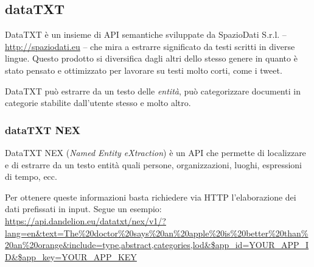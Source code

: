 \subsection{dataTXT}
	DataTXT è un insieme di API semantiche sviluppate da SpazioDati S.r.l.  -- \url{http://spaziodati.eu} -- che mira a estrarre significato da testi scritti in diverse lingue. Questo prodotto si diversifica dagli altri dello stesso genere in quanto è stato pensato e ottimizzato per lavorare su testi molto corti, come i tweet.

	DataTXT può estrarre da un testo delle \emph{entità}, può categorizzare documenti in categorie stabilite dall'utente stesso e molto altro.

%
%

	\subsubsection{dataTXT NEX}
		DataTXT NEX (\emph{Named Entity eXtraction}) è un API che permette di localizzare e di estrarre da un testo entità quali persone, organizzazioni, luoghi, espressioni di tempo, ecc.

		Per ottenere queste informazioni basta richiedere via HTTP l'elaborazione dei dati  prefissati in input. Segue un esempio: \url{https://api.dandelion.eu/datatxt/nex/v1/?lang=en&text=The%20doctor%20says%20an%20apple%20is%20better%20than%20an%20orange&include=type,abstract,categories,lod&$app_id=YOUR_APP_ID&$app_key=YOUR_APP_KEY}


